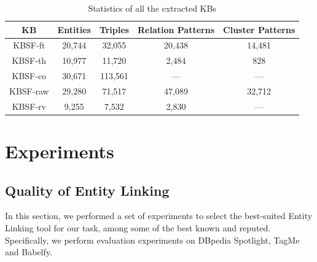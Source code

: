 \begin{table}[ht!]
\scriptsize
\centering
	\begin{tabular}{ | c | c | c | c | c | }
	\hline
	\textbf{KB} & \textbf{Entities} & \textbf{Triples} & \textbf{Relation Patterns} & \textbf{Cluster Patterns} \\
	\hline
	\textsc{KBSF}-ft & 20,744 & 32,055 & 20,438 & 14,481 \\
	\textsc{KBSF}-th & 10,977 & 11,720 & 2,484 & 828 \\
	\hline
	\textsc{KBSF}-co & 30,671 & 113,561 & --- & --- \\
	\textsc{KBSF}-raw & 29,280 & 71,517 & 47,089 & 32,712 \\
	\hline
	\textsc{KBSF}-rv & 9,255 & 7,532 & 2,830 & --- \\
	\hline
	\end{tabular}
	\caption{Statistics of all the extracted KBs}
	\label{tab:kbs}
\end{table}


\section{Experiments}
\label{sec:kb:experiments}

\subsection{Quality of Entity Linking}
\label{sec:kb:experiments:qualityentitylinking}

In this section, we performed a set of experiments to select the best-suited Entity Linking tool for our task, among some of the best known and reputed. Specifically, we perform evaluation experiments on DBpedia Spotlight, TagMe and Babelfy. 



